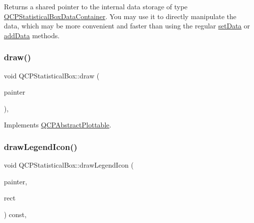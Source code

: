 Returns a shared pointer to the internal data storage of type \mbox{\hyperlink{qcustomplot_8h_a8b773c0c35f8f924701ced6e9915e4c7}{Q\+C\+P\+Statistical\+Box\+Data\+Container}}. You may use it to directly manipulate the data, which may be more convenient and faster than using the regular \mbox{\hyperlink{class_q_c_p_statistical_box_a08a6da55822bad825ee25a8069b9b52f}{set\+Data}} or \mbox{\hyperlink{class_q_c_p_statistical_box_a9a8739c5b8291db8fd839e892fc8f478}{add\+Data}} methods. \mbox{\label{class_q_c_p_statistical_box_afcff35fa79728cfe10e80e0702014fea}} 
\subsubsection{\texorpdfstring{draw()}{draw()}}
{\footnotesize\ttfamily void Q\+C\+P\+Statistical\+Box\+::draw (\begin{DoxyParamCaption}\item[{\mbox{\hyperlink{class_q_c_p_painter}{Q\+C\+P\+Painter}} $\ast$}]{painter }\end{DoxyParamCaption})\hspace{0.3cm}{\ttfamily [protected]}, {\ttfamily [virtual]}}



Implements \mbox{\hyperlink{class_q_c_p_abstract_plottable_a453f676a5cee7bf846c5f0fa05ea84b3}{Q\+C\+P\+Abstract\+Plottable}}.

\mbox{\label{class_q_c_p_statistical_box_ad286c63a79c21d5231a4b6c6fdbb914f}} 
\subsubsection{\texorpdfstring{drawLegendIcon()}{drawLegendIcon()}}
{\footnotesize\ttfamily void Q\+C\+P\+Statistical\+Box\+::draw\+Legend\+Icon (\begin{DoxyParamCaption}\item[{\mbox{\hyperlink{class_q_c_p_painter}{Q\+C\+P\+Painter}} $\ast$}]{painter,  }\item[{const Q\+RectF \&}]{rect }\end{DoxyParamCaption}) const\hspace{0.3cm}{\ttfamily [protected]}, {\ttfamily [virtual]}}



